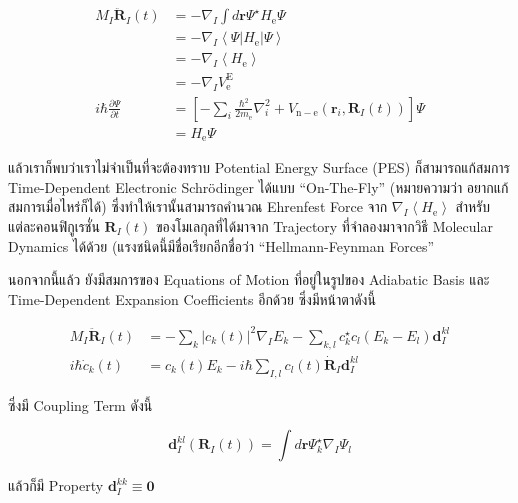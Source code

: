 \begin{align}
  M_I \ddot{\mathbf{R}}_I(t)
   & = -\nabla_I \int d \mathbf{r} \Psi^{\star} H_{\mathrm{e}} \Psi                         \\
   & = -\nabla_I\left\langle\Psi\left|H_{\mathrm{e}}\right| \Psi\right\rangle               \\
   & = -\nabla_I\left\langle H_{\mathrm{e}}\right\rangle                                    \\
  \label{eq:Ehrenfest_coupled_eq_1}
   & = -\nabla_I V_{\mathrm{e}}^{\mathrm{E}}                                                \\
  i \hbar \frac{\partial \Psi}{\partial t}
   & = \left[-\sum_i \frac{\hbar^2}{2 m_{\mathrm{e}}}
  \nabla_i^2+V_{\mathrm{n}-\mathrm{e}}\left(\mathbf{r}_i,\mathbf{R}_I(t)\right)\right] \Psi \\
  \label{eq:Ehrenfest_coupled_eq_2}
   & = H_{\mathrm{e}} \Psi
\end{align}

\noindent แล้วเราก็พบว่าเราไม่จำเป็นที่จะต้องทราบ Potential Energy Surface (PES) ก็สามารถแก้สมการ Time-Dependent Electronic
Schr\"{o}dinger ได้แบบ \enquote{On-The-Fly} (หมายความว่า อยากแก้สมการเมื่อไหร่ก็ได้) ซึ่งทำให้เรานั้นสามารถคำนวณ Ehrenfest
Force จาก $\nabla_I\left\langle H_{\mathrm{e}}\right\rangle$ สำหรับแต่ละคอนฟิกูเรชั่น $\mathbf{R}_I(t)$
ของโมเลกุลที่ได้มาจาก Trajectory ที่จำลองมาจากวิธี Molecular Dynamics ได้ด้วย (แรงชนิดนี้มีชื่อเรียกอีกชื่อว่า \enquote{Hellmann-Feynman
  Forces}

นอกจากนี้แล้ว ยังมีสมการของ Equations of Motion ที่อยู่ในรูปของ Adiabatic Basis และ Time-Dependent Expansion Coefficients
อีกด้วย ซึ่งมีหน้าตาดังนี้

\begin{align}
  M_I \ddot{\mathbf{R}}_I(t) &
  =
  -\sum_k\left|c_k(t)\right|^2 \nabla_I E_k-\sum_{k, l} c_k^{\star} c_l\left(E_k-E_l\right) \mathbf{d}_I^{k l} \\
  i \hbar \dot{c}_k(t)
                             & = c_k(t) E_k-i \hbar \sum_{I, l} c_l(t) \dot{\mathbf{R}}_I \mathbf{d}_I^{k l}
\end{align}

\noindent ซึ่งมี Coupling Term ดังนี้

\begin{equation}
  \mathbf{d}_I^{k l}\left(\mathbf{R}_I(t)\right)
  =
  \int d \mathbf{r} \Psi_k^{\star} \nabla_I \Psi_l
\end{equation}

\noindent แล้วก็มี Property $\mathbf{d}_I^{k k} \equiv \mathbf{0}$

